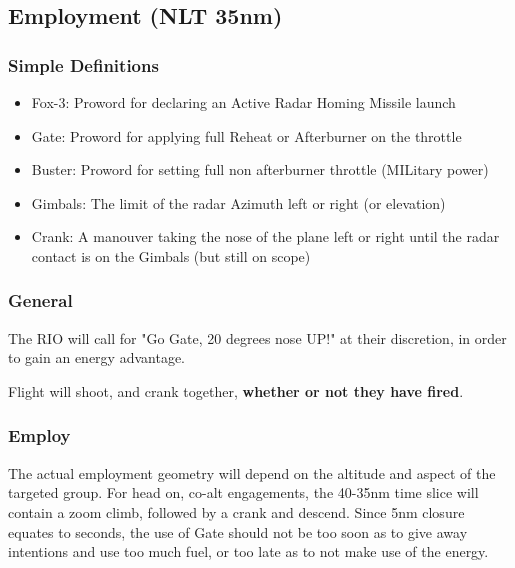 \subsection{Employment (NLT 35nm)}

\subsubsection*{Simple Definitions}

\begin{itemize}

  \item Fox-3: Proword for declaring an Active Radar Homing Missile launch

  \item Gate: Proword for applying full Reheat or Afterburner on the throttle

  \item Buster: Proword for setting full non afterburner throttle (MILitary
    power)

  \item Gimbals: The limit of the radar Azimuth left or right (or elevation)

  \item Crank: A manouver taking the nose of the plane left or right until the
    radar contact is on the Gimbals (but still on scope)

\end{itemize}

\subsubsection*{General}

The RIO will call for "Go Gate, 20 degrees nose UP!" at their discretion, in
order to gain an energy advantage.

Flight will shoot, and crank together, \textbf{whether or not they have fired}.

\subsubsection*{Employ}

The actual employment geometry will depend on the altitude and aspect of the
targeted group. For head on, co-alt engagements, the 40-35nm time slice will
contain a zoom climb, followed by a crank and descend. Since 5nm closure
equates to  seconds, the use of Gate should not be too soon as to
give away intentions and use too much fuel, or too late as to not make use of
the energy.

